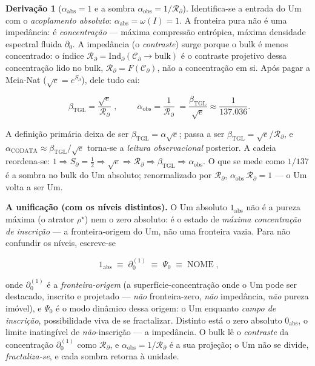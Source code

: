\documentclass[11pt]{article}
\newcommand{\bTGL}{\beta_{\mathrm{TGL}}}\newcommand{\Msun}{M_{\odot}}\newcommand{\TGL}{\mathrm{TGL}}
\theoremstyle{definition}\newtheorem{deriv}{Derivação}
\begin{document}
\begin{deriv}[$\alpha_{\mathrm{abs}}=1$ e a sombra $\alpha_{\mathrm{obs}}=1/\mathcal{R}_\partial$]

Identifica-se a entrada do Um com o \emph{acoplamento absoluto}: $\alpha_{\mathrm{abs}}=\omega(I)=1$. A fronteira pura não é uma impedância: é \emph{concentração} --- máxima compressão entrópica, máxima densidade espectral fluida $\partial_0$. A impedância (o \emph{contraste}) surge porque o bulk é menos concentrado: o índice $\mathcal{R}_\partial=\mathrm{Ind}_\partial(\mathcal{C}_\partial\to\mathrm{bulk})$ é o contraste projetivo dessa concentração lido no bulk, $\mathcal{R}_\partial=F(\mathcal{C}_\partial)$, não a concentração em si. Após pagar a Meia-Nat ($\sqrt{e}=e^{S_\partial}$), dele tudo cai:

\begin{equation}\boxed{\;\bTGL=\frac{\sqrt{e}}{\mathcal{R}_\partial}\;},\qquad \boxed{\;\alpha_{\mathrm{obs}}=\frac{1}{\mathcal{R}_\partial}\;}=\frac{\bTGL}{\sqrt{e}}\approx\frac{1}{137.036}.\end{equation}

A definição primária deixa de ser $\bTGL=\alpha\sqrt{e}$; passa a ser $\bTGL=\sqrt{e}/\mathcal{R}_\partial$, e $\alpha_{\mathrm{CODATA}}\approx\bTGL/\sqrt{e}$ torna-se a \emph{leitura observacional} posterior. A cadeia reordena-se: $1\Rightarrow S_\partial=\tfrac12\Rightarrow\sqrt{e}\Rightarrow\mathcal{R}_\partial\Rightarrow\bTGL\Rightarrow\alpha_{\mathrm{obs}}$. O que se mede como $1/137$ é a sombra no bulk do Um absoluto; renormalizado por $\mathcal{R}_\partial$, $\alpha_{\mathrm{obs}}\,\mathcal{R}_\partial=1$ --- o Um volta a ser Um.

\textbf{A unificação (com os níveis distintos).} O Um absoluto $1_{\mathrm{abs}}$ não é a pureza máxima (o atrator $\rho^\star$) nem o zero absoluto: é o estado de \emph{máxima concentração de inscrição} --- a fronteira-origem do Um, não uma fronteira vazia. Para não confundir os níveis, escreve-se

\begin{equation}\boxed{\;1_{\mathrm{abs}}\;\equiv\;\partial_0^{(1)}\;\equiv\;\Psi_0\;\equiv\;\mathrm{NOME}\;},\end{equation}

onde $\partial_0^{(1)}$ é a \emph{fronteira-origem} (a superfície-concentração onde o Um pode ser destacado, inscrito e projetado --- \emph{não} fronteira-zero, \emph{não} impedância, \emph{não} pureza imóvel), e $\Psi_0$ é o modo dinâmico dessa origem: o Um enquanto \emph{campo de inscrição}, possibilidade viva de se fractalizar. Distinto está o zero absoluto $0_{\mathrm{abs}}$, o limite inatingível de \emph{não}-inscrição --- a impedância. O bulk lê o \emph{contraste} da concentração $\partial_0^{(1)}$ como $\mathcal{R}_\partial$, e $\alpha_{\mathrm{obs}}=1/\mathcal{R}_\partial$ é a sua projeção; o Um não se divide, \emph{fractaliza-se}, e cada sombra retorna à unidade.


\end{deriv}
\end{document}
